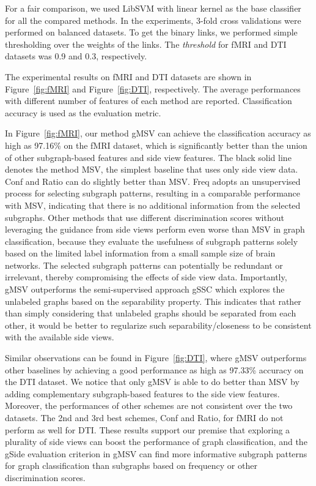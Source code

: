\documentclass[conference]{IEEEtran}
\newcommand{\gscore}[0]{gSide}
\newcommand{\galgo}[0]{gMSV}
\newcommand{\gssc}[0]{gSSC}
\newcommand{\duga}[0]{Conf}
\newcommand{\dugb}[0]{Ratio}
\newcommand{\topk}[0]{Freq}
\newcommand{\side}[0]{MSV}
\begin{document}
For a fair comparison, we used LibSVM \cite{libsvm} with linear kernel as the base classifier for all the compared methods. In the experiments, 3-fold cross validations were performed on balanced datasets. To get the binary links, we performed simple thresholding over the weights of the links. The \emph{threshold} for fMRI and DTI datasets was 0.9 and 0.3, respectively. 

The experimental results on fMRI and DTI datasets are shown in Figure~\ref{fig:fMRI} and Figure~\ref{fig:DTI}, respectively. The average performances with different number of features of each method are reported. Classification accuracy is used as the evaluation metric.

In Figure~\ref{fig:fMRI}, our method {\galgo} can achieve the classification accuracy as high as 97.16\% on the fMRI dataset, which is significantly better than the union of other subgraph-based features and side view features. The black solid line denotes the method {\side}, the simplest baseline that uses only side view data. {\duga} and {\dugb} can do slightly better than {\side}. {\topk} adopts an unsupervised process for selecting subgraph patterns, resulting in a comparable performance with {\side}, indicating that there is no additional information from the selected subgraphs. Other methods that use different discrimination scores without leveraging the guidance from side views perform even worse than {\side} in graph classification, because they evaluate the usefulness of subgraph patterns solely based on the limited label information from a small sample size of brain networks. The selected subgraph patterns can potentially be redundant or irrelevant, thereby compromising the effects of side view data. Importantly, {\galgo} outperforms the semi-supervised approach {\gssc} which explores the unlabeled graphs based on the separability property. This indicates that rather than simply considering that unlabeled graphs should be separated from each other, it would be better to regularize such separability/closeness to be consistent with the available side views.
 
Similar observations can be found in Figure~\ref{fig:DTI}, where {\galgo} outperforms other baselines by achieving a good performance as high as 97.33\% accuracy on the DTI dataset. We notice that only {\galgo} is able to do better than {\side} by adding complementary subgraph-based features to the side view features. Moreover, the performances of other schemes are not consistent over the two datasets. The 2nd and 3rd best schemes, {\duga} and {\dugb}, for fMRI do not perform as well for DTI. These results support our premise that exploring a plurality of side views can boost the performance of graph classification, and the {\gscore} evaluation criterion in {\galgo} can find more informative subgraph patterns for graph classification than subgraphs based on frequency or other discrimination scores.
\end{document}
